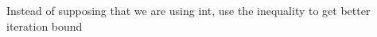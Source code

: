 
\begin{DoxyRefList}
\item[Member \mbox{\hyperlink{classi_r_r_a_m_1_1_p_o_w_e_r_s_e_r_i_e_s_a04a9cbaea8ae39ba9caa9be2e38c72ef}{i\+R\+R\+AM::P\+O\+W\+E\+R\+S\+E\+R\+I\+ES::eval\+Helper}} (int p, const C\+O\+M\+P\+L\+EX \&z, int d)]\label{todo__todo000001}%
%
Instead of supposing that we are using int, use the inequality to get better iteration bound 
\end{DoxyRefList}